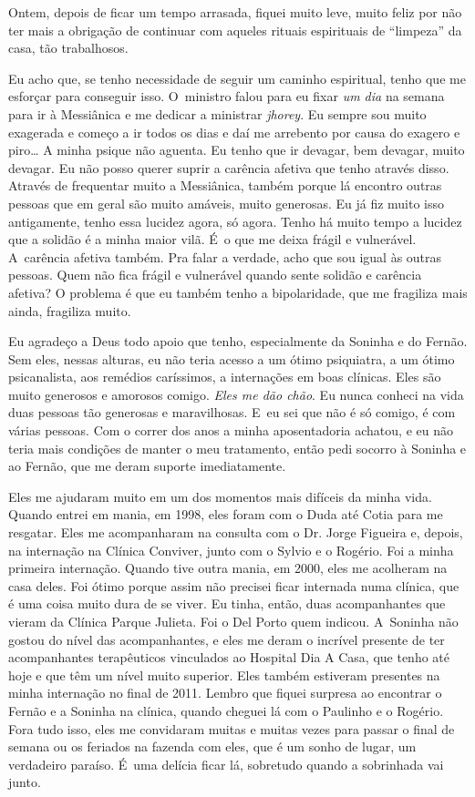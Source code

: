 Ontem, depois de ficar um tempo arrasada, fiquei muito leve, muito feliz
por não ter mais a obrigação de continuar com aqueles rituais
espirituais de ``limpeza'' da casa, tão trabalhosos.

Eu acho que, se tenho necessidade de seguir um caminho espiritual, tenho
que me esforçar para conseguir isso. O~ministro falou para eu fixar
\emph{um dia} na semana para ir à Messiânica e me dedicar a ministrar
\emph{jhorey}. Eu sempre sou muito exagerada e começo a ir todos os dias
e daí me arrebento por causa do exagero e piro… A minha
psique não aguenta. Eu tenho que ir devagar, bem devagar, muito devagar.
Eu não posso querer suprir a carência afetiva que tenho através disso.
Através de frequentar muito a Messiânica, também porque lá encontro
outras pessoas que em geral são muito amáveis, muito generosas. Eu já
fiz muito isso antigamente, tenho essa lucidez agora, só agora. Tenho há
muito tempo a lucidez que a solidão é a minha maior vilã. É~o que me
deixa frágil e vulnerável. A~carência afetiva também. Pra falar a
verdade, acho que sou igual às outras pessoas. Quem não fica frágil e
vulnerável quando sente solidão e carência afetiva? O problema é que eu
também tenho a bipolaridade, que me fragiliza mais ainda, fragiliza
muito.

Eu agradeço a Deus todo apoio que tenho, especialmente da Soninha e do
Fernão. Sem eles, nessas alturas, eu não teria acesso a um ótimo
psiquiatra, a um ótimo psicanalista, aos remédios caríssimos, a
internações em boas clínicas. Eles são muito generosos e amorosos
comigo. \emph{Eles me dão chão}. Eu nunca conheci na vida duas pessoas
tão generosas e maravilhosas. E~eu sei que não é só comigo, é com várias
pessoas. Com o correr dos anos a minha aposentadoria achatou, e eu não
teria mais condições de manter o meu tratamento, então pedi socorro à
Soninha e ao Fernão, que me deram suporte imediatamente.

Eles me ajudaram muito em um dos momentos mais difíceis da minha
vida. Quando entrei em mania, em 1998, eles foram com o Duda até Cotia
para me resgatar. Eles me acompanharam na consulta com o Dr. Jorge
Figueira e, depois, na internação na Clínica Conviver, junto com o
Sylvio e o Rogério. Foi a minha primeira internação. Quando tive outra
mania, em 2000, eles me acolheram na casa deles. Foi ótimo porque assim
não precisei ficar internada numa clínica, que é uma coisa muito dura de
se viver. Eu tinha, então, duas acompanhantes que vieram da Clínica
Parque Julieta. Foi o Del Porto quem indicou. A~Soninha não gostou do
nível das acompanhantes, e eles me deram o incrível presente de ter
acompanhantes terapêuticos vinculados ao Hospital Dia A Casa, que tenho
até hoje e que têm um nível muito superior. Eles também estiveram
presentes na minha internação no final de 2011. Lembro que fiquei
surpresa ao encontrar o Fernão e a Soninha na clínica, quando cheguei lá
com o Paulinho e o Rogério. Fora tudo isso, eles me convidaram muitas e
muitas vezes para passar o final de semana ou os feriados na fazenda com
eles, que é um sonho de lugar, um verdadeiro paraíso. É~uma delícia
ficar lá, sobretudo quando a sobrinhada vai junto.

